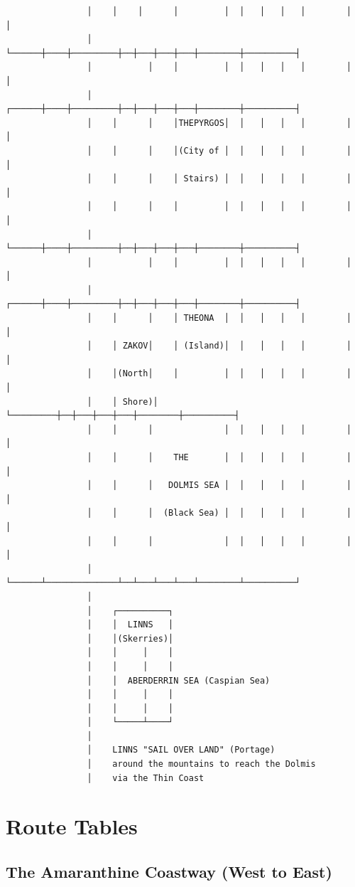 \documentclass[12pt,oneside]{book}
\begin{document}
\begin{verbatim}
                │    │    │      │         │  │   │   │   │        │          │
                │    └──────┼────┼─────────┼──┼───┼───┼───┼────────┼──────────┤
                │           │    │         │  │   │   │   │        │          │
                │    ┌──────┼────┼─────────┼──┼───┼───┼───┼────────┼──────────┤
                │    │      │    │THEPYRGOS│  │   │   │   │        │          │
                │    │      │    │(City of │  │   │   │   │        │          │
                │    │      │    │ Stairs) │  │   │   │   │        │          │
                │    │      │    │         │  │   │   │   │        │          │
                │    └──────┼────┼─────────┼──┼───┼───┼───┼────────┼──────────┤
                │           │    │         │  │   │   │   │        │          │
                │    ┌──────┼────┼─────────┼──┼───┼───┼───┼────────┼──────────┤
                │    │      │    │ THEONA  │  │   │   │   │        │          │
                │    │ ZAKOV│    │ (Island)│  │   │   │   │        │          │
                │    │(North│    │         │  │   │   │   │        │          │
                │    │ Shore)│   └─────────┼──┼───┼───┼───┼────────┼──────────┤
                │    │      │              │  │   │   │   │        │          │
                │    │      │    THE       │  │   │   │   │        │          │
                │    │      │   DOLMIS SEA │  │   │   │   │        │          │
                │    │      │  (Black Sea) │  │   │   │   │        │          │
                │    │      │              │  │   │   │   │        │          │
                │    └──────┴──────────────┴──┴───┴───┴───┴────────┴──────────┘
                │
                │    ┌──────────┐
                │    │  LINNS   │
                │    │(Skerries)│
                │    │     │    │
                │    │     │    │
                │    │  ABERDERRIN SEA (Caspian Sea)
                │    │     │    │
                │    │     │    │
                │    └─────┴────┘
                │
                │    LINNS "SAIL OVER LAND" (Portage)
                │    around the mountains to reach the Dolmis
                │    via the Thin Coast
\end{verbatim}

\section{Route Tables}

\subsection{The Amaranthine Coastway (West to East)}
\end{document}
